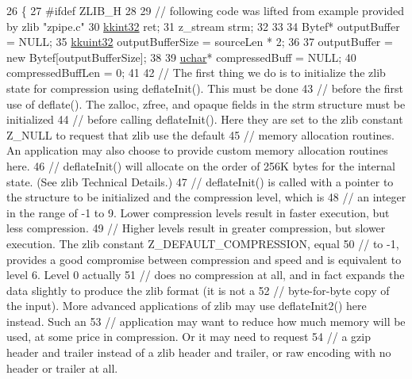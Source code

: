\begin{DoxyCode}
26 \{
27 \textcolor{preprocessor}{#ifdef ZLIB\_H}
28 
29   \textcolor{comment}{// following code was lifted from example provided by zlib  "zpipe.c"}
30   \hyperlink{namespace_k_k_b_a8fa4952cc84fda1de4bec1fbdd8d5b1b}{kkint32}   ret;
31   z\_stream  strm;
32 
33 
34   Bytef*  outputBuffer = NULL;
35   \hyperlink{namespace_k_k_b_af8d832f05c54994a1cce25bd5743e19a}{kkuint32}  outputBufferSize = sourceLen * 2;
36 
37   outputBuffer = \textcolor{keyword}{new} Bytef[outputBufferSize];
38 
39   \hyperlink{namespace_k_k_b_ace9969169bf514f9ee6185186949cdf7}{uchar}*  compressedBuff = NULL;
40   compressedBuffLen     = 0;
41 
42   \textcolor{comment}{//  The first thing we do is to initialize the zlib state for compression using deflateInit(). This must
       be done}
43   \textcolor{comment}{// before the first use of deflate(). The zalloc, zfree, and opaque fields in the strm structure must be
       initialized}
44   \textcolor{comment}{// before calling deflateInit(). Here they are set to the zlib constant Z\_NULL to request that zlib use
       the default}
45   \textcolor{comment}{// memory allocation routines. An application may also choose to provide custom memory allocation
       routines here.}
46   \textcolor{comment}{// deflateInit() will allocate on the order of 256K bytes for the internal state. (See zlib Technical
       Details.)}
47   \textcolor{comment}{// deflateInit() is called with a pointer to the structure to be initialized and the compression level,
       which is}
48   \textcolor{comment}{// an integer in the range of -1 to 9. Lower compression levels result in faster execution, but less
       compression.}
49   \textcolor{comment}{// Higher levels result in greater compression, but slower execution. The zlib constant
       Z\_DEFAULT\_COMPRESSION, equal}
50   \textcolor{comment}{// to -1, provides a good compromise between compression and speed and is equivalent to level 6. Level 0
       actually}
51   \textcolor{comment}{// does no compression at all, and in fact expands the data slightly to produce the zlib format (it is
       not a}
52   \textcolor{comment}{// byte-for-byte copy of the input). More advanced applications of zlib may use deflateInit2() here
       instead. Such an}
53   \textcolor{comment}{// application may want to reduce how much memory will be used, at some price in compression. Or it may
       need to request}
54   \textcolor{comment}{// a gzip header and trailer instead of a zlib header and trailer, or raw encoding with no header or
       trailer at all.}

\end{DoxyCode}
